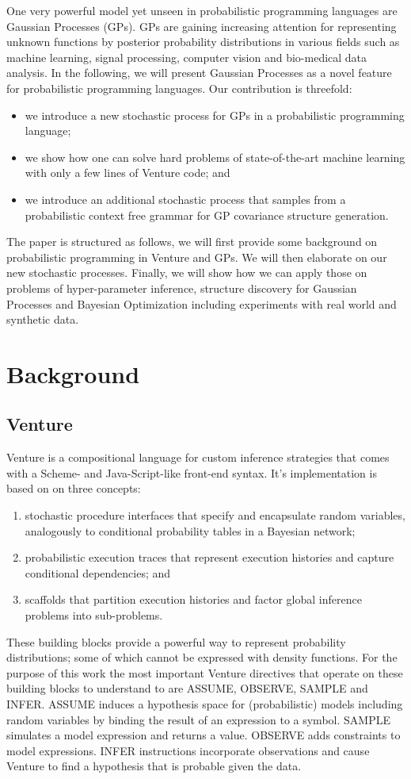 \documentclass{article} %
\begin{document}
One very powerful model yet unseen in probabilistic programming languages are Gaussian Processes (GPs). GPs are gaining increasing attention for representing unknown functions by posterior probability distributions in various fields such as machine learning, signal processing, computer vision and bio-medical data analysis. In the following, we will present Gaussian Processes as a novel feature for probabilistic programming languages. Our contribution is threefold:
\begin{itemize}
 \item we introduce a new stochastic process for GPs in a probabilistic programming language;
 \item we show how one can solve hard problems of state-of-the-art machine learning with only a few lines of Venture code; and
 \item we introduce an additional stochastic process that samples from a probabilistic context free grammar for GP covariance structure generation.
\end{itemize}

The paper is structured as follows, we will first provide some background on probabilistic programming in Venture and GPs. We will then elaborate on our new stochastic processes. Finally, we will show how we can apply those on problems of hyper-parameter inference, structure discovery for Gaussian Processes and Bayesian Optimization including experiments with real world and synthetic data.
\section{Background}
\subsection{Venture}
Venture is a compositional language for custom inference strategies that comes with a Scheme- and Java-Script-like front-end syntax. It's implementation is based on on three concepts:
\begin{enumerate}
 \item stochastic procedure interfaces that specify and encapsulate random variables, analogously to conditional probability tables in a Bayesian network;
 \item probabilistic execution traces that represent execution histories and capture conditional dependencies; and
 \item scaffolds that partition execution histories and factor global inference problems into sub-problems.
\end{enumerate}
These building blocks provide a powerful way to represent probability distributions; some of which cannot be expressed with density functions. For the purpose of this work the most important Venture directives that operate on these building blocks to understand to are ASSUME, OBSERVE, SAMPLE and INFER. ASSUME induces a hypothesis space for (probabilistic) models including random variables by binding the result of an expression to a symbol. SAMPLE simulates a model expression and returns a value. OBSERVE adds constraints to model expressions. INFER instructions incorporate observations and cause Venture to find a hypothesis that is probable given the data. 
\end{document}
